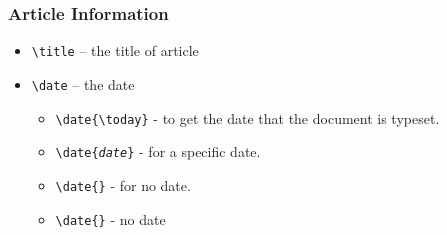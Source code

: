 \documentclass{article}%
\begin{document}
\subsubsection{Article Information}
\begin{itemize}
\item \verb|\title| -- the title of article%
\item \verb|\date| -- the date %
  \begin{itemize}
  \item \texttt{\textbackslash date\{\textbackslash today\}} - to get the
    date that the document is typeset.
  \item \texttt{\textbackslash date\{\emph{date}\}} - for a specific date.
  \item \texttt{\textbackslash date\{\}} - for no date.%
  \item \verb|\date{}| - no date
  \end{itemize}
\end{itemize}
\end{document}
